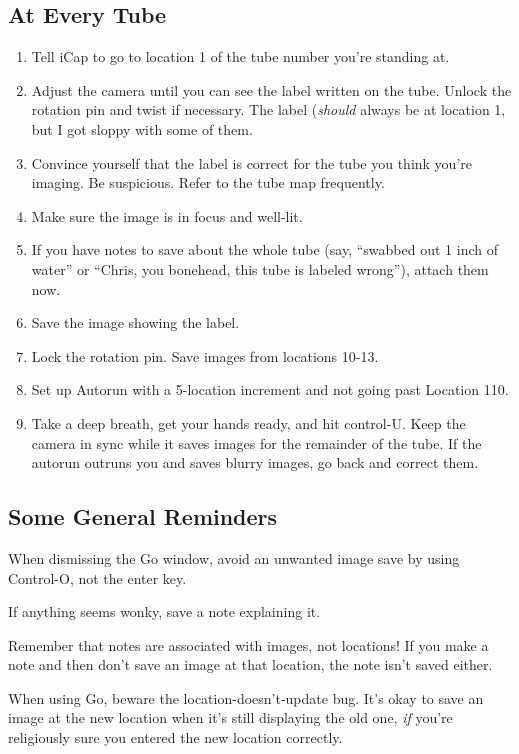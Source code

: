 \documentclass[11pt]{article}
\begin{document}
\subsection{At Every Tube}
	\begin{enumerate}
		\item{Tell iCap to go to location 1 of the tube number you're standing at.}
		\item{Adjust the camera until you can see the label written on the tube. Unlock the rotation pin and twist if necessary. The label (\textit{should} always be at location 1, but I got sloppy with some of them.}
		\item{Convince yourself that the label is correct for the tube you think you're imaging. Be suspicious. Refer to the tube map frequently.}
		\item{Make sure the image is in focus and well-lit.}
		\item{If you have notes to save about the whole tube (say, ``swabbed out 1 inch of water'' or ``Chris, you bonehead, this tube is labeled wrong''), attach them now.}
		\item{Save the image showing the label.}
		\item{Lock the rotation pin. Save images from locations 10-13.}
		\item{Set up Autorun with a 5-location increment and not going past Location 110.}
		\item{Take a deep breath, get your hands ready, and hit control-U. Keep the camera in sync while it saves images for the remainder of the tube. If the autorun outruns you and saves blurry images, go back and correct them.}
	\end{enumerate}	

\subsection{Some General Reminders}

	When dismissing the Go window, avoid an unwanted image save by using Control-O, not the enter key.
	
	If anything seems wonky, save a note explaining it.
	
	Remember that notes are associated with images, not locations! If you make a note and then don't save an image at that location, the note isn't saved either.
	
	When using Go, beware the location-doesn't-update bug. It's okay to save an image at the new location when it's still displaying the old one, \textit{if} you're religiously sure you entered the new location correctly.
	
\end{document}
